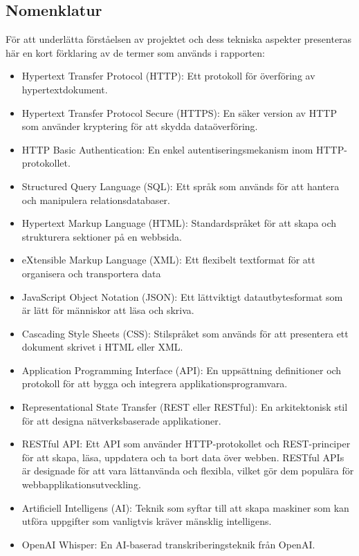 \subsection{Nomenklatur}
För att underlätta förståelsen av projektet och dess tekniska aspekter
presenteras här en kort förklaring av de termer som används i rapporten:
\begin{itemize}
    \item Hypertext Transfer Protocol (HTTP): Ett protokoll för överföring av
    hypertextdokument.
    \item Hypertext Transfer Protocol Secure (HTTPS): En säker version av HTTP
    som använder kryptering för att skydda dataöverföring.
    \item HTTP Basic Authentication: En enkel autentiseringsmekanism inom
    HTTP-protokollet.
    \item Structured Query Language (SQL): Ett språk som används för att
    hantera och manipulera relationsdatabaser.
    \item Hypertext Markup Language (HTML): Standardspråket för att skapa och
    strukturera sektioner på en webbsida.
    \item eXtensible Markup Language (XML): Ett flexibelt textformat för att
    organisera och transportera data
    \item JavaScript Object Notation (JSON): Ett lättviktigt datautbytesformat
    som är lätt för människor att läsa och skriva.
    \item Cascading Style Sheets (CSS): Stilspråket som används för att
    presentera ett dokument skrivet i HTML eller XML.
    \item Application Programming Interface (API): En uppsättning definitioner
    och protokoll för att bygga och integrera applikationsprogramvara.
    \item Representational State Transfer (REST eller RESTful): En
    arkitektonisk stil för att designa nätverksbaserade applikationer.
    \item RESTful API: Ett API som använder HTTP-protokollet och REST-principer
    för att skapa, läsa, uppdatera och ta bort data över webben. RESTful APIs
    är designade för att vara lättanvända och flexibla, vilket gör dem populära
    för webbapplikationsutveckling.
    \item Artificiell Intelligens (AI): Teknik som syftar till att skapa
    maskiner som kan utföra uppgifter som vanligtvis kräver mänsklig
    intelligens.
    \item OpenAI Whisper: En AI-baserad transkriberingsteknik från
    OpenAI.
\end{itemize}

